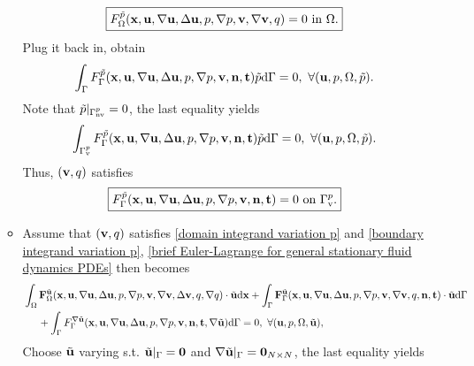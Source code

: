 \documentclass[oneside]{book}
\numberwithin{equation}{section}
\begin{document}
\begin{itemize}[leftmargin=0in]
\begin{itemize}
\begin{align}
            \label{domain integrand variation p}
            \boxed{F_\Omega^{\tilde{p}}({\bf x},{\bf u},\nabla{\bf u},\Delta{\bf u},p,\nabla p,{\bf v},\nabla{\bf v},q) = 0 \mbox{ in } \Omega.}
        \end{align}
        Plug it back in, obtain
        \begin{align*}
            \int_\Gamma F_\Gamma^{\tilde{p}}({\bf x},{\bf u},\nabla{\bf u},\Delta{\bf u},p,\nabla p,{\bf v},{\bf n},{\bf t})\tilde{p}{\rm d}\Gamma = 0,\ \forall({\bf u},p,\Omega,\tilde{p}).
        \end{align*}
        Note that $\tilde{p}|_{\Gamma_{\rm nv}^p} = 0$, the last equality yields
        \begin{align*}
            \int_{\Gamma_{\rm v}^p} F_\Gamma^{\tilde{p}}({\bf x},{\bf u},\nabla{\bf u},\Delta{\bf u},p,\nabla p,{\bf v},{\bf n},{\bf t})\tilde{p}{\rm d}\Gamma = 0,\ \forall({\bf u},p,\Omega,\tilde{p}).
        \end{align*}
        Thus, $({\bf v},q)$ satisfies
        \begin{align}
            \label{boundary integrand variation p}
            \boxed{F_\Gamma^{\tilde{p}}({\bf x},{\bf u},\nabla{\bf u},\Delta{\bf u},p,\nabla p,{\bf v},{\bf n},{\bf t}) = 0 \mbox{ on } \Gamma_{\rm v}^p.}
        \end{align}
        \item Assume that $({\bf v},q)$ satisfies \eqref{domain integrand variation p} and \eqref{boundary integrand variation p}, \eqref{brief Euler-Lagrange for general stationary fluid dynamics PDEs} then becomes
        \begin{align*}
            &\int_\Omega {\bf F}_\Omega^{\tilde{\bf u}}({\bf x},{\bf u},\nabla{\bf u},\Delta{\bf u},p,\nabla p,{\bf v},\nabla{\bf v},\Delta{\bf v},q,\nabla q)\cdot\tilde{\bf u}{\rm d}{\bf x} + \int_\Gamma {\bf F}_\Gamma^{\tilde{\bf u}}({\bf x},{\bf u},\nabla{\bf u},\Delta{\bf u},p,\nabla p,{\bf v},\nabla{\bf v},q,{\bf n},{\bf t})\cdot\tilde{\bf u}{\rm d}\Gamma\\
            &\hspace{5mm}+ \int_\Gamma F_\Gamma^{\nabla\tilde{\bf u}}({\bf x},{\bf u},\nabla{\bf u},\Delta{\bf u},p,\nabla p,{\bf v},{\bf n},{\bf t},\nabla\tilde{\bf u}){\rm d}\Gamma = 0,\ \forall({\bf u},p,\Omega,\tilde{\bf u}),
        \end{align*}
        Choose $\tilde{\bf u}$ varying s.t. $\tilde{\bf u}|_\Gamma = {\bf 0}$ and $\nabla\tilde{\bf u}|_\Gamma = {\bf 0}_{N\times N}$, the last equality yields
        \begin{align*}

\end{align*}
\end{itemize}
\end{itemize}
\end{document}
